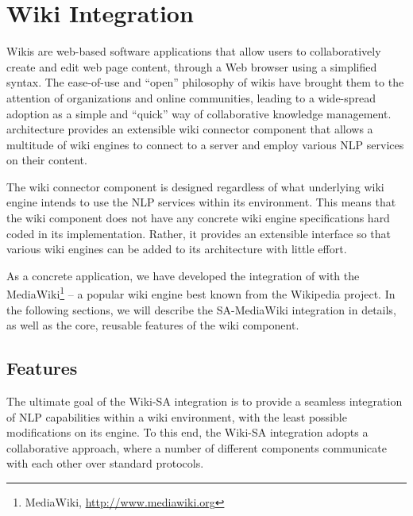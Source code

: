 %
%
%   
% 

\chapter{Wiki Integration}
Wikis are web-based software applications that allow users to collaboratively create and edit web page content, through a Web browser using a simplified syntax. The ease-of-use and ``open'' philosophy of wikis have brought them to the attention of organizations and online communities, leading to a wide-spread adoption as a simple and ``quick'' way of collaborative knowledge management. \sa architecture provides an extensible wiki connector component that allows a multitude of wiki engines to connect to a \sa server and employ various NLP services on their content.

The wiki connector component is designed regardless of what underlying wiki engine intends to use the NLP services within its environment. This means that the wiki component does not have any concrete wiki engine specifications hard coded in its implementation. Rather, it provides an extensible interface so that various wiki engines can be added to its architecture with little effort.

As a concrete application, we have developed the integration of \sa with the MediaWiki\footnote{MediaWiki, \url{http://www.mediawiki.org}} -- a popular wiki engine best known from the Wikipedia project. In the following sections, we will describe the SA-MediaWiki integration in details, as well as the core, reusable features of the wiki component.

\section{Features}
The ultimate goal of the Wiki-SA integration is to provide a seamless integration of NLP capabilities within a wiki environment, with the least possible modifications on its engine. To this end, the Wiki-SA integration adopts a collaborative approach, where a number of different components communicate with each other over standard protocols.

